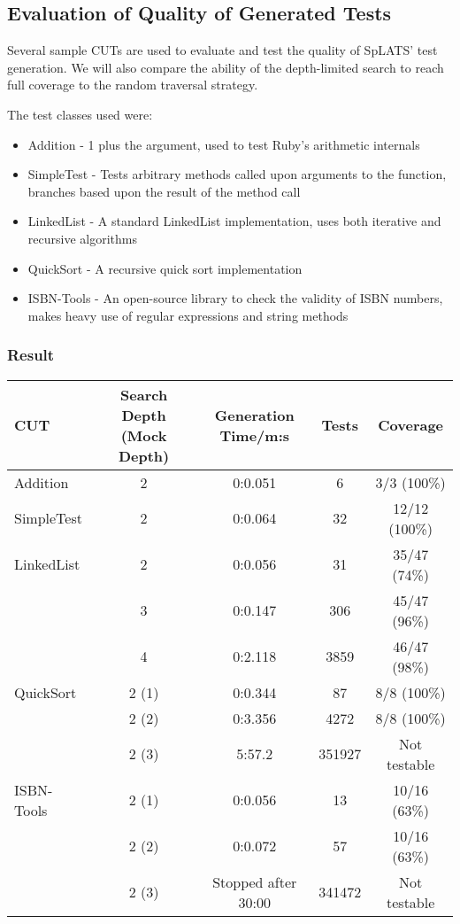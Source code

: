   \subsection{Evaluation of Quality of Generated Tests}
    Several sample CUTs are used to evaluate and test the quality of SpLATS'
test generation. We will also compare the ability of the depth-limited search to
reach full coverage to the random traversal strategy.

    The test classes used were:
    \begin{itemize}
      \item Addition - 1 plus the argument, used to test Ruby's arithmetic
internals
      \item SimpleTest - Tests arbitrary methods called upon arguments to the
function, branches based upon the result of the method call
      \item LinkedList - A standard LinkedList implementation, uses both
iterative and recursive algorithms
      \item QuickSort - A recursive quick sort implementation
      \item ISBN-Tools - An open-source library to check the validity of ISBN
numbers, makes heavy use of regular expressions and string methods
    \end{itemize}

  \subsubsection{Result}

    \begin{tabular}{|l|cccc|}
\hline
\textbf{CUT} & \textbf{Search Depth (Mock Depth)} & \textbf{Generation Time/m:s} & \textbf{Tests} & \textbf{Coverage} \\
\hline
Addition & 2 & 0:0.051 & 6 & 3/3 (100\%) \\
\hline
SimpleTest & 2 & 0:0.064 & 32 & 12/12 (100\%) \\
\hline
LinkedList & 2 & 0:0.056 & 31 & 35/47 (74\%) \\
& 3 & 0:0.147 & 306 & 45/47 (96\%) \\
& 4 & 0:2.118 & 3859 & 46/47 (98\%)\\
\hline
QuickSort & 2 (1) & 0:0.344 & 87 & 8/8 (100\%) \\
& 2 (2) & 0:3.356 & 4272 & 8/8 (100\%) \\
& 2 (3) & 5:57.2 & 351927 & Not testable\\
\hline
ISBN-Tools & 2 (1) & 0:0.056 & 13 & 10/16 (63\%) \\
& 2 (2) & 0:0.072 & 57 & 10/16 (63\%) \\
& 2 (3) & Stopped after 30:00 & 341472 & Not testable \\
\hline
\end{tabular}

